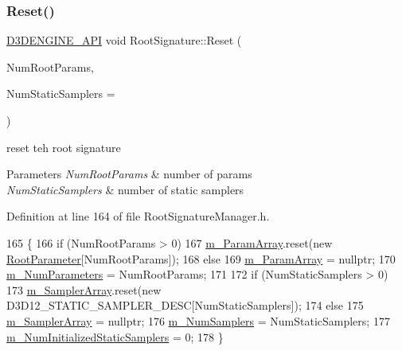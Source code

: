\subsubsection{\texorpdfstring{Reset()}{Reset()}}
{\footnotesize\ttfamily \mbox{\hyperlink{stdafx_8h_a8ee2d990c5dfba7794dd2b60741d7722}{D3\+D\+E\+N\+G\+I\+N\+E\+\_\+\+A\+PI}} void Root\+Signature\+::\+Reset (\begin{DoxyParamCaption}\item[{U\+I\+NT}]{Num\+Root\+Params,  }\item[{U\+I\+NT}]{Num\+Static\+Samplers = {} }\end{DoxyParamCaption})\hspace{0.3cm}{\ttfamily [inline]}}



reset teh root signature 


\begin{DoxyParams}{Parameters}
{\em Num\+Root\+Params} & number of params \\
\hline
{\em Num\+Static\+Samplers} & number of static samplers \\
\hline
\end{DoxyParams}


Definition at line 164 of file Root\+Signature\+Manager.\+h.


\begin{DoxyCode}
165     \{
166         \textcolor{keywordflow}{if} (NumRootParams > 0)
167             \mbox{\hyperlink{class_root_signature_a4b0c1a56f8fe468fc8ca30dccf490eaa}{m\_ParamArray}}.reset(\textcolor{keyword}{new} \mbox{\hyperlink{class_root_parameter}{RootParameter}}[NumRootParams]);
168         \textcolor{keywordflow}{else}
169             \mbox{\hyperlink{class_root_signature_a4b0c1a56f8fe468fc8ca30dccf490eaa}{m\_ParamArray}} = \textcolor{keyword}{nullptr};
170         \mbox{\hyperlink{class_root_signature_a2f4c499d12d76b357853b100ebb6d8fa}{m\_NumParameters}} = NumRootParams;
171 
172         \textcolor{keywordflow}{if} (NumStaticSamplers > 0)
173             \mbox{\hyperlink{class_root_signature_a7fea24906a1437ca55aaac9a8f6cc2f4}{m\_SamplerArray}}.reset(\textcolor{keyword}{new} D3D12\_STATIC\_SAMPLER\_DESC[NumStaticSamplers]);
174         \textcolor{keywordflow}{else}
175             \mbox{\hyperlink{class_root_signature_a7fea24906a1437ca55aaac9a8f6cc2f4}{m\_SamplerArray}} = \textcolor{keyword}{nullptr};
176         \mbox{\hyperlink{class_root_signature_a1c558da623e1304988f56e78e957ac34}{m\_NumSamplers}} = NumStaticSamplers;
177         \mbox{\hyperlink{class_root_signature_a4512fb5980e654113a04e4aff00e8bd7}{m\_NumInitializedStaticSamplers}} = 0;
178     \}
\end{DoxyCode}


